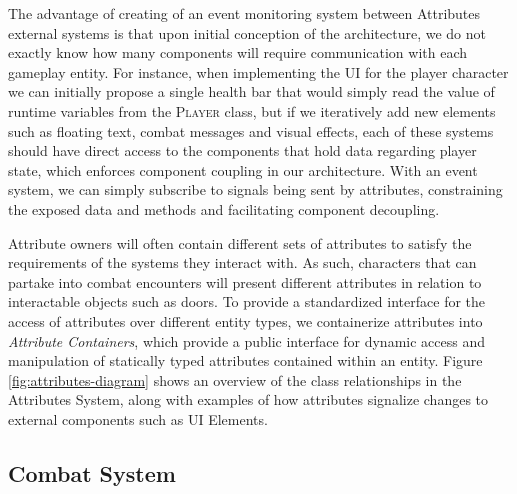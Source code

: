 The advantage of creating of an event monitoring system between Attributes external systems is that upon initial conception of the architecture, we do not exactly know how many components will require communication with each gameplay entity. For instance, when implementing the UI for the player character we can initially propose a single health bar that would simply read the value of runtime variables from the \textsc{Player} class, but if we iteratively add new elements such as floating text, combat messages and visual effects, each of these systems should have direct access to the components that hold data regarding player state, which enforces component coupling in our architecture. With an event system, we can simply subscribe to signals being sent by attributes, constraining the exposed data and methods and facilitating component decoupling.

Attribute owners will often contain different sets of attributes to satisfy the requirements of the systems they interact with. As such, characters that can partake into combat encounters will present different attributes in relation to interactable objects such as doors. To provide a standardized interface for the access of attributes over different entity types, we containerize attributes into \emph{Attribute Containers}, which provide a public interface for dynamic access and manipulation of statically typed attributes contained within an entity. Figure \ref{fig:attributes-diagram} shows an overview of the class relationships in the Attributes System, along with examples of how attributes signalize changes to external components such as UI Elements.




\subsection{Combat System}

